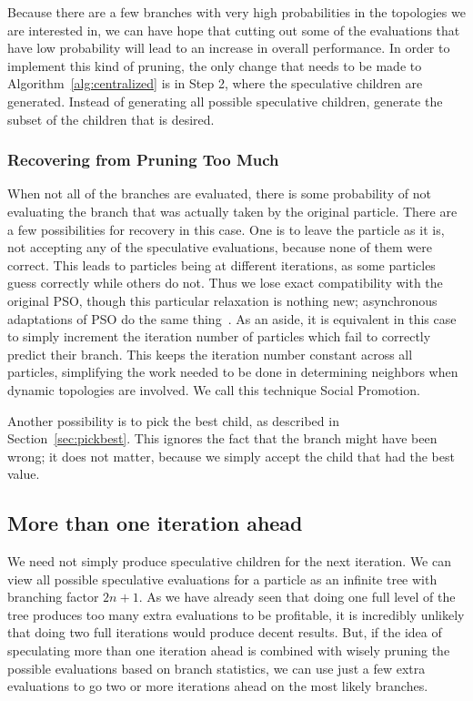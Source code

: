 \documentclass[smallcondensed]{svjour3}
\renewcommand{\sec}[1]{Section~\ref{sec:#1}}
\newcommand{\alg}[1]{Algorithm~\ref{alg:#1}}
\begin{document}
Because there are a few branches with very high probabilities in the topologies
we are interested in, we can have hope that cutting out some of the evaluations
that have low probability will lead to an increase in overall performance.  In
order to implement this kind of pruning, the only change that needs to be made
to \alg{centralized} is in Step 2, where the speculative children are
generated.  Instead of generating all possible speculative children, generate
the subset of the children that is desired.

\subsubsection{Recovering from Pruning Too Much}
\label{sec:wrong}

When not all of the branches are evaluated, there is some probability of not
evaluating the branch that was actually taken by the original particle.  There
are a few possibilities for recovery in this case.  One is to leave the
particle as it is, not accepting any of the speculative evaluations, because
none of them were correct.  This leads to particles being at different
iterations, as some particles guess correctly while others do not.  Thus we
lose exact compatibility with the original PSO, though this particular
relaxation is nothing new; asynchronous adaptations of PSO do the same
thing~\citep{koh-2006-parallel-asynchronous-pso}.  As an aside, it is equivalent
in this case to simply increment the iteration number of particles which fail
to correctly predict their branch.  This keeps the iteration number constant
across all particles, simplifying the work needed to be done in determining
neighbors when dynamic topologies are involved.  We call this technique Social
Promotion.

Another possibility is to pick the best child, as described in \sec{pickbest}.
This ignores the fact that the branch might have been wrong; it does not
matter, because we simply accept the child that had the best value.

\subsection{More than one iteration ahead}
\label{sec:manyiters}

We need not simply produce speculative children for the next iteration.  We can
view all possible speculative evaluations for a particle as an infinite tree
with branching factor $2n+1$.  As we have already seen that doing one full
level of the tree produces too many extra evaluations to be profitable, it is
incredibly unlikely that doing two full iterations would produce decent
results.  But, if the idea of speculating more than one iteration ahead is
combined with wisely pruning the possible evaluations based on branch
statistics, we can use just a few extra evaluations to go two or more
iterations ahead on the most likely branches.
\end{document}
